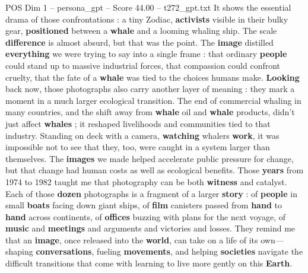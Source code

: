 \begin{textsample}{POS Dim 1 – persona\_gpt – Score 44.00 – t272\_gpt.txt}
It shows the essential drama of those confrontations : a tiny Zodiac, \textbf{activists} visible in their bulky gear, \textbf{positioned} between a \textbf{whale} and a looming whaling ship.
The scale \textbf{difference} is almost absurd, but that was the point.
The \textbf{image} distilled \textbf{everything} we were trying to say into a single frame : that ordinary \textbf{people} could stand up to massive industrial forces, that compassion could confront cruelty, that the fate of a \textbf{whale} was tied to the choices humans make. \textbf{Looking} back now, those photographs also carry another layer of meaning : they mark a moment in a much larger ecological transition.
The end of commercial whaling in many countries, and the shift away from \textbf{whale} oil and \textbf{whale} products, didn't just affect \textbf{whales} ; it reshaped livelihoods and communities tied to that industry.
Standing on deck with a camera, \textbf{watching} whalers \textbf{work}, it was impossible not to see that they, too, were caught in a system larger than themselves.
The \textbf{images} we made helped accelerate public pressure for change, but that change had human costs as well as ecological benefits.
Those \textbf{years} from 1974 to 1982 taught me that photography can be both \textbf{witness} and catalyst.
Each of those \textbf{dozen} photographs is a fragment of a larger \textbf{story} : of \textbf{people} in small \textbf{boats} facing down giant ships, of \textbf{film} canisters passed from \textbf{hand} to \textbf{hand} across continents, of \textbf{offices} buzzing with plans for the next voyage, of \textbf{music} and \textbf{meetings} and arguments and victories and losses.
They remind me that an \textbf{image}, once released into the \textbf{world}, can take on a life of its own—shaping \textbf{conversations}, fueling \textbf{movements}, and helping \textbf{societies} navigate the difficult transitions that come with learning to live more gently on this \textbf{Earth}.

\end{textsample}
